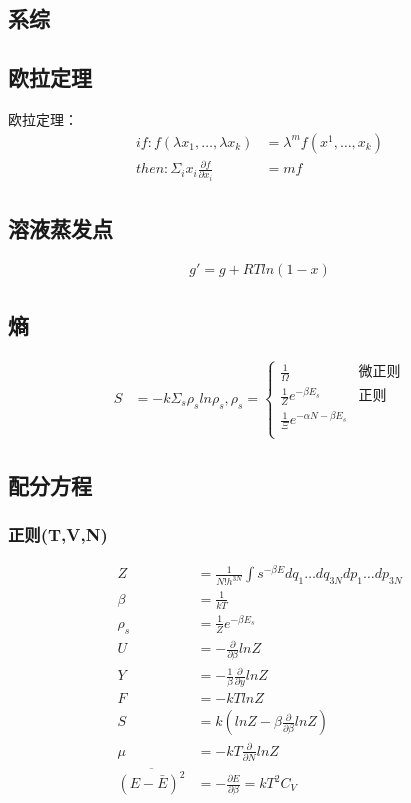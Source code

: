 \documentclass[a4paper,12pt]{article}
\begin{document}
\begin{CJK*}{UTF8}{gbsn}
\begin{spacing}{1.3}
\section{系综}
\subsection{欧拉定理}
\indent 欧拉定理：
\begin{align}
  if: f(\lambda x_1,\ldots,\lambda x_k) &= \lambda^mf(x^1,\ldots,x_k)\\
  then:\Sigma_i x_i\frac{\partial f}{\partial x_i} &= mf
\end{align}
\subsection{溶液蒸发点}
\begin{align}
  g' = g + RTln(1-x)
\end{align}
\subsection{熵}
\begin{align}
  S &= -k\Sigma_s \rho_s ln\rho_s,
  \rho_s =
    \begin{cases}
    \frac{1}{\Omega}& \text{微正则}\\
    \frac{1}{Z}e^{-\beta E_s}& \text{正则}\\
    \frac{1}{\Xi}e^{-\alpha N-\beta E_s}\\
    \end{cases}
\end{align}

\subsection{配分方程}
\subsubsection{正则(T,V,N)}
\begin{align}
  Z &= \frac{1}{N!h^{3N}}\int s^{-\beta E}dq_1\ldots dq_{3N}dp_1\ldots dp_{3N}\\
  \beta &= \frac{1}{kT}\\
  \rho_s &= \frac{1}{Z}e^{-\beta E_s}\\
  U &= -\frac{\partial}{\partial\beta}lnZ\\
  Y &= -\frac{1}{\beta}\frac{\partial}{\partial y}lnZ\\
  F &= -kTlnZ\\
  S &= k(lnZ - \beta\frac{\partial}{\partial\beta}lnZ)\\
  \mu &= -kT\frac{\partial}{\partial N}lnZ\\
  \overline{(E-\bar{E})^2} &= -\frac{\partial E}{\partial\beta} = kT^2C_V
\end{align}

\end{spacing}
\end{CJK*}
\end{document}
